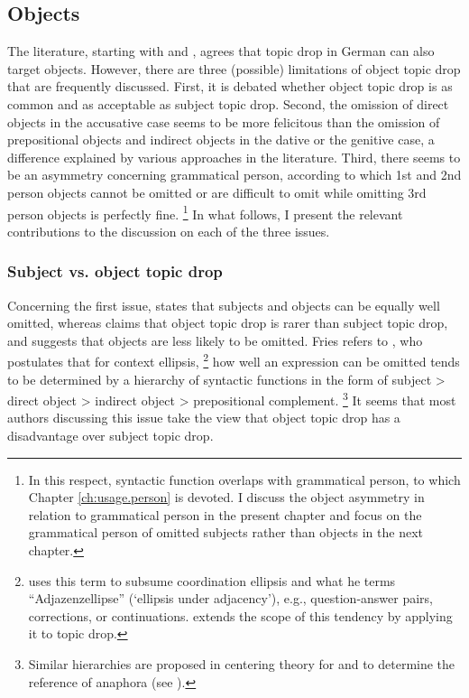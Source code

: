 \subsection{Objects}
The literature, starting with \citet{ross1982} and \citet{huang1984}, agrees that topic drop in German can also target objects.
However, there are three (possible) limitations of object topic drop that are frequently discussed.
First, it is debated whether object topic drop is as common and as acceptable as subject topic drop.
Second, the omission of direct objects in the accusative case  seems to be more felicitous than the omission of prepositional objects  and indirect objects in the dative  or the genitive case,  a difference explained by various approaches in the literature.
Third, there seems to be an asymmetry concerning grammatical person, according to which 1st and 2nd person objects cannot be omitted or are difficult to omit while omitting 3rd person objects is perfectly fine.%
\footnote{In this respect, syntactic function overlaps with grammatical person, to which Chapter \ref{ch:usage.person} is devoted.
I discuss the object asymmetry in relation to grammatical person in the present chapter and focus on the grammatical person of omitted subjects rather than objects in the next chapter.
} %
In what follows, I present the relevant contributions to the discussion on each of the three issues.

\subsubsection{Subject vs. object topic drop}
Concerning the first issue, \citet[2]{trutkowski2016} states that subjects and objects can be equally well omitted, whereas \citet{volodina2011} claims that object topic drop is rarer than subject topic drop, and \citet{fries1988} suggests that objects are less likely to be omitted.
Fries refers to \citet[15]{klein1985}, who postulates that for context ellipsis,%
\footnote{\citet[5]{klein1985} uses this term to subsume coordination ellipsis and what he terms ``Adjazenzellipse'' (`ellipsis under adjacency'), e.g., question-answer pairs, corrections, or continuations.
\citet{fries1988} extends the scope of this tendency by applying it to topic drop.}
%
how well an expression can be omitted tends to be determined by a hierarchy of syntactic functions in the form of subject > direct object > indirect object > prepositional  complement.%
\footnote{Similar hierarchies are proposed in centering theory \citep{grosz.etal1995} for  \citep{walker.etal1998} and  \citep{speyer2007} to determine the reference of anaphora (see ).
}
It seems that most authors discussing this issue take the view that object topic drop has a disadvantage over subject topic drop.

